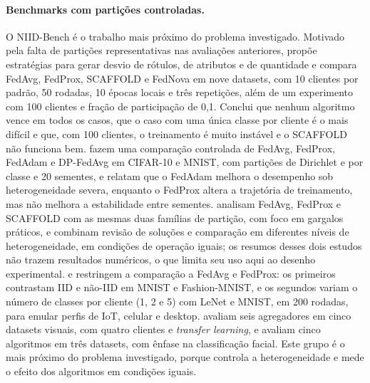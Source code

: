 \paragraph{Benchmarks com partições controladas.}
O NIID-Bench \citep{li2022niidbench} é o trabalho mais próximo do problema investigado. Motivado pela falta de partições representativas nas avaliações anteriores, propõe estratégias para gerar desvio de rótulos, de atributos e de quantidade e compara FedAvg, FedProx, SCAFFOLD e FedNova em nove datasets, com 10 clientes por padrão, 50 rodadas, 10 épocas locais e três repetições, além de um experimento com 100 clientes e fração de participação de 0,1. Conclui que nenhum algoritmo vence em todos os casos, que o caso com uma única classe por cliente é o mais difícil e que, com 100 clientes, o treinamento é muito instável e o SCAFFOLD não funciona bem. \citet{enang2026optimiser} fazem uma comparação controlada de FedAvg, FedProx, FedAdam e DP-FedAvg em CIFAR-10 e MNIST, com partições de Dirichlet e por classe e 20 sementes, e relatam que o FedAdam melhora o desempenho sob heterogeneidade severa, enquanto o FedProx altera a trajetória de treinamento, mas não melhora a estabilidade entre sementes. \citet{ikram2026empirical} analisam FedAvg, FedProx e SCAFFOLD com as mesmas duas famílias de partição, com foco em gargalos práticos, e \citet{mora2022empirical} combinam revisão de soluções e comparação em diferentes níveis de heterogeneidade, em condições de operação iguais; os resumos desses dois estudos não trazem resultados numéricos, o que limita seu uso aqui ao desenho experimental. \citet{sevinc2025distribution} e \citet{ananouch2025optimization} restringem a comparação a FedAvg e FedProx: os primeiros contrastam IID e não-IID em MNIST e Fashion-MNIST, e os segundos variam o número de classes por cliente (1, 2 e 5) com LeNet e MNIST, em 200 rodadas, para emular perfis de IoT, celular e desktop. \citet{onlu2025aggregation} avaliam seis agregadores em cinco datasets visuais, com quatro clientes e \textit{transfer learning}, e \citet{nascimento2024dataskew} avaliam cinco algoritmos em três datasets, com ênfase na classificação facial. Este grupo é o mais próximo do problema investigado, porque controla a heterogeneidade e mede o efeito dos algoritmos em condições iguais.

